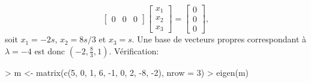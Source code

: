 \begin{exercice}
\begin{sol}
\begin{enumerate}
\begin{displaymath}
\begin{bmatrix}
          0 & 0 & 0
        \end{bmatrix}
        \begin{bmatrix} x_1 \\ x_2 \\ x_3 \end{bmatrix} =
        \begin{bmatrix} 0 \\ 0 \\ 0 \end{bmatrix},
      \end{displaymath}
      soit $x_1 = -2s$, $x_2 = 8s/3$ et $x_3 = s$. Une base de
      vecteurs propres correspondant à $\lambda = -4$ est donc $(-2,
      \frac{8}{3}, 1)$.  Vérification:
\begin{Schunk}
\begin{Sinput}
> m <- matrix(c(5, 0, 1, 6, -1, 0, 2, -8, -2), nrow = 3)
> eigen(m)
\end{Sinput}
\end{Schunk}
\end{enumerate}
\end{sol}
\end{exercice}
